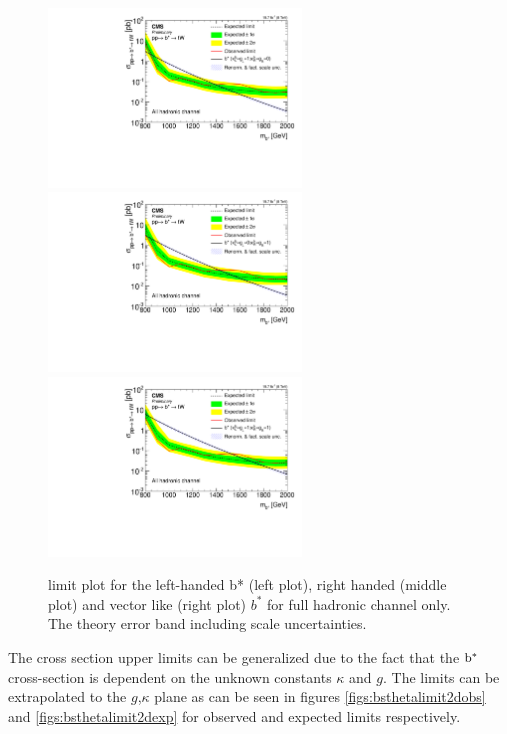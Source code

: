 \begin{figure}[htcb]
\centering
\includegraphics[width=0.6\textwidth]{AN-14-049/figs/bayesian_hadronic_left_limit_band_plot}\\
\includegraphics[width=0.6\textwidth]{AN-14-049/figs/bayesian_hadronic_right_limit_band_plot}\\
\includegraphics[width=0.6\textwidth]{AN-14-049/figs/bayesian_hadronic_vector_limit_band_plot}
\caption{limit plot for the left-handed b* (left plot), right handed (middle plot) and vector like (right plot) $b^*$ for full hadronic channel only. The theory error band including scale uncertainties.}
\label{figs:bslimitshad}
\end{figure}




The cross section upper limits can be generalized due to the fact that the $\mathrm{b}^{*}$ cross-section is dependent on the unknown constants $\kappa$ and $g$.%
The limits can be extrapolated to the $g$,$\kappa$ plane as can be seen in figures \ref{figs:bsthetalimit2dobs} and \ref{figs:bsthetalimit2dexp} for observed and expected limits respectively.

